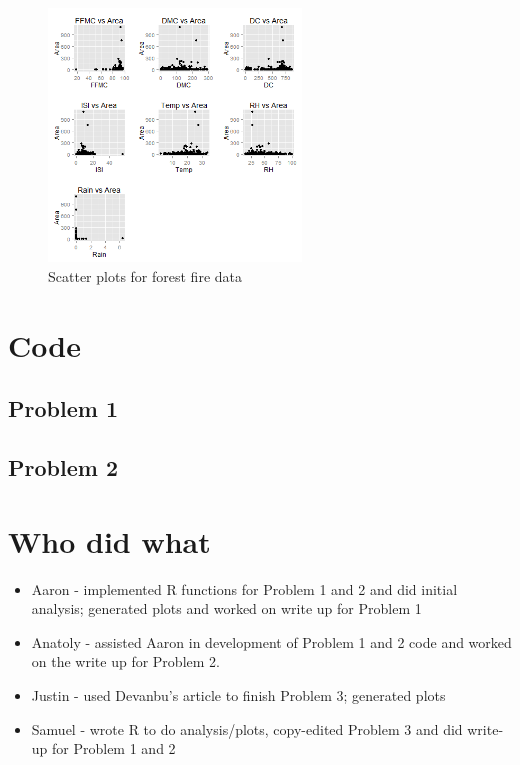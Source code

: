 \documentclass{article}
\begin{document}
\begin{figure}[h]
  \centering
  \includegraphics[width=0.6\textwidth]{figures/forestfire.png}
  \caption{Scatter plots for forest fire data}
  \label{fig:fire_scatters}
\end{figure}

\section{Code}
\subsection{Problem 1}

\subsection{Problem 2}


\section{Who did what}
\begin{itemize}
	\item Aaron - implemented R functions for Problem 1 and 2 and did initial analysis; generated plots and worked on write up for Problem 1
	\item Anatoly - assisted Aaron in development of Problem 1 and 2 code and worked on the write up for Problem 2.
	\item Justin - used Devanbu's article to finish Problem 3; generated plots
	\item Samuel - wrote R to do analysis/plots, copy-edited Problem 3 and did write-up for Problem 1 and 2
\end{itemize}
\end{document}
